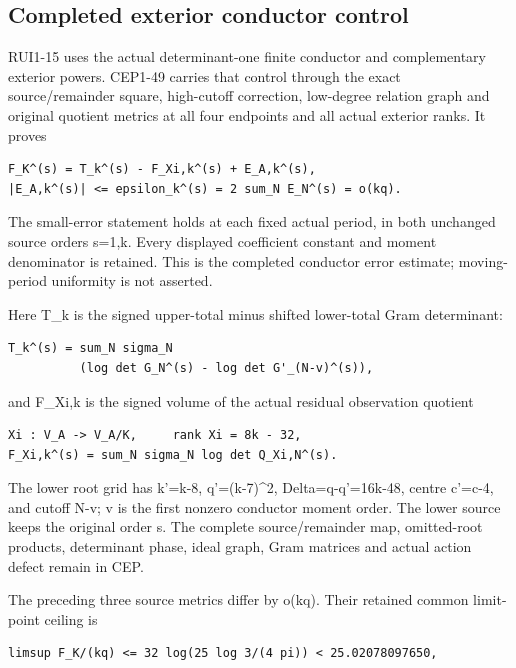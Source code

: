 \documentclass[
]{article}
\begin{document}
\subsection{Completed exterior conductor
control}\label{completed-exterior-conductor-control}

RUI1-15 uses the actual determinant-one finite conductor and
complementary exterior powers. CEP1-49 carries that control through the
exact source/remainder square, high-cutoff correction, low-degree
relation graph and original quotient metrics at all four endpoints and
all actual exterior ranks. It proves

\begin{verbatim}
F_K^(s) = T_k^(s) - F_Xi,k^(s) + E_A,k^(s),
|E_A,k^(s)| <= epsilon_k^(s) = 2 sum_N E_N^(s) = o(kq).
\end{verbatim}

The small-error statement holds at each fixed actual period, in both
unchanged source orders s=1,k. Every displayed coefficient constant and
moment denominator is retained. This is the completed conductor error
estimate; moving-period uniformity is not asserted.

Here T\_k is the signed upper-total minus shifted lower-total Gram
determinant:

\begin{verbatim}
T_k^(s) = sum_N sigma_N
          (log det G_N^(s) - log det G'_(N-v)^(s)),
\end{verbatim}

and F\_Xi,k is the signed volume of the actual residual observation
quotient

\begin{verbatim}
Xi : V_A -> V_A/K,     rank Xi = 8k - 32,
F_Xi,k^(s) = sum_N sigma_N log det Q_Xi,N^(s).
\end{verbatim}

The lower root grid has k'=k-8, q'=(k-7)\^{}2, Delta=q-q'=16k-48, centre
c'=c-4, and cutoff N-v; v is the first nonzero conductor moment order.
The lower source keeps the original order s. The complete
source/remainder map, omitted-root products, determinant phase, ideal
graph, Gram matrices and actual action defect remain in CEP.

The preceding three source metrics differ by o(kq). Their retained
common limit-point ceiling is

\begin{verbatim}
limsup F_K/(kq) <= 32 log(25 log 3/(4 pi)) < 25.02078097650,
\end{verbatim}
\end{document}

